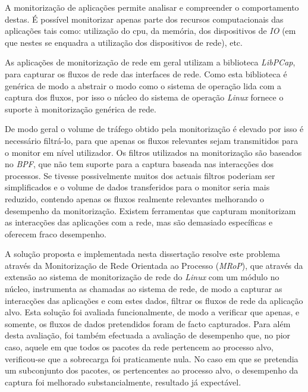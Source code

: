 \resumo 

A monitorização de aplicações permite analisar e compreender o comportamento destas. 
É possível monitorizar apenas parte dos recursos computacionais das aplicações tais como: utilização do cpu, da memória, dos dispositivos de \textit{IO} (em que nestes se enquadra a utilização dos dispositivos de rede), etc. 

As aplicações de monitorização de rede em geral utilizam a biblioteca \textit{LibPCap}, para capturar os fluxos de rede das interfaces de rede.
Como esta biblioteca é genérica de modo a abstrair o modo como o sistema de operação lida com a captura dos fluxos, por isso o núcleo do sistema de operação \textit{Linux} fornece o suporte à monitorização genérica de rede.

De modo geral o volume de tráfego obtido pela monitorização é elevado por isso é necessário filtrá-lo, para que apenas os fluxos relevantes sejam transmitidos para o monitor em nível utilizador.
Os filtros utilizados na monitorização são baseados no \textit{BPF}, que não tem suporte para a captura baseada nas interacções dos processos.
Se tivesse possivelmente muitos dos actuais filtros poderiam ser simplificados e o volume de dados transferidos para o monitor seria mais reduzido, contendo apenas os fluxos realmente relevantes melhorando o desempenho da monitorização.
Existem ferramentas que capturam monitorizam as interacções das aplicações com a rede, mas são demasiado específicas e oferecem fraco desempenho.

A solução proposta e implementada nesta dissertação resolve este problema através da Monitorização de Rede Orientada ao Processo (\textit{MRoP}), que através da extensão ao sistema de monitorização de rede do \textit{Linux} com um módulo no núcleo, instrumenta as chamadas ao sistema de rede, de modo a capturar as interacções das aplicações e com estes dados, filtrar os fluxos de rede da aplicação alvo.
Esta solução foi avaliada funcionalmente, de modo a verificar que apenas, e somente, os fluxos de dados pretendidos foram de facto capturados.
Para além desta avaliação, foi também efectuada a avaliação de desempenho que, no pior caso, aquele em que todos os pacotes da rede pertencem ao processo alvo, verificou-se que a sobrecarga foi praticamente nula.
No caso em que se pretendia um subconjunto dos pacotes, os pertencentes ao processo alvo, o desempenho da captura foi melhorado substancialmente, resultado já expectável.


